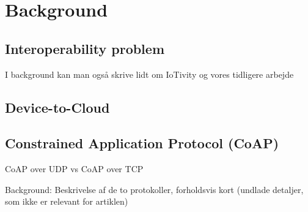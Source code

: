 \section{Background}



\subsection{Interoperability problem}
I background kan man også skrive lidt om IoTivity og vores tidligere arbejde

\subsection{Device-to-Cloud}


\subsection{Constrained Application Protocol (CoAP)}
CoAP over UDP vs CoAP over TCP

Background: Beskrivelse af de to protokoller, forholdsvis kort (undlade detaljer, som ikke er relevant for artiklen)
